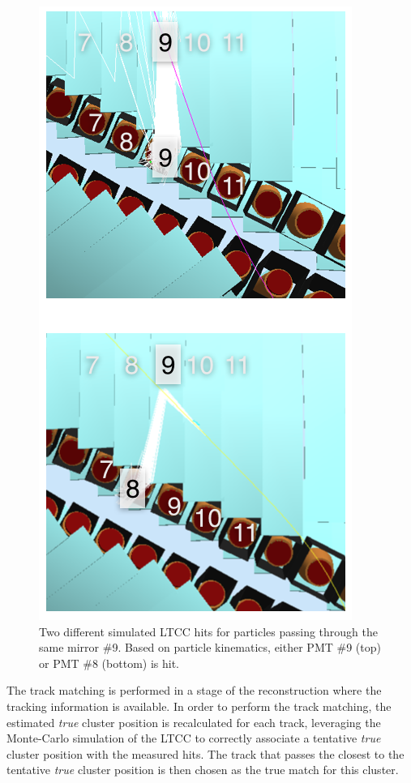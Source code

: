 \begin{figure}
  \centering
  \includegraphics[width=0.99\columnwidth,keepaspectratio]{img/trackmatching.png}
  \caption{Two different simulated LTCC hits for particles passing through the same mirror
  \#9. Based on particle kinematics, either PMT \#9 (top) or PMT \#8 (bottom) is hit.}
  \label{fig:trackmatching}
\end{figure}

The track matching is performed in a stage of the reconstruction where the tracking
information is available. In order to perform the track matching, the estimated
\textit{true} cluster position is recalculated for each track, leveraging the Monte-Carlo
simulation of the LTCC to correctly associate a tentative \textit{true} cluster position
with the measured hits.
The track that passes the closest to the tentative \textit{true} cluster position is
then chosen as the true match for this cluster.
